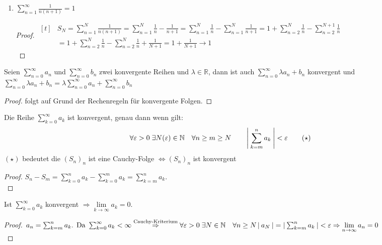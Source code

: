 \documentclass[a4paper,titlepage,oneside]{article}
\def\N{\ensuremath{\mathbb{N}} }
\def\R{\ensuremath{\mathbb{R}} }
\renewcommand{\epsilon}{\ensuremath{\varepsilon} }
\def\sp{\hspace{0,1cm}}
\newcommand{\suminf}[2][n]{\ensuremath{\sum_{#1= 0}^{\infty}{#2}}}
\newcommand{\Suminf}[2][n]{\ensuremath{\sum_{#1=1}^{\infty}{#2}}}
\renewcommand{\liminf}[2][n]{\ensuremath{\lim\limits_{#1 \rightarrow \infty}{#2}}}
\newcommand{\abs}[1]{\ensuremath{\left|\:#1\:\right|}}
\theoremstyle{thmstyle}
\begin{document}
\begin{subbsp}
\begin{enumerate}
\item $ \Suminf{\frac{1}{n(n+1)}}= 1 $
\begin{proof}
$\begin{aligned}[t]
&S_N = \sum_{n=1}^{N}{\frac{1}{n(n+1)}} = \sum_{n=1}^{N}{\frac{1}{n}} - \frac{1}{n+1} = \sum_{n=1}^{N}{\frac{1}{n}} - \sum_{n=1}^{N}{\frac{1}{n+1}}
= 1 + \sum_{n=2}^{N}{\frac{1}{n}} - \sum_{n=2}^{N+1}{\frac{1}{n}} \\
&= 1 + \sum_{n=2}^{N}{\frac{1}{n}} - \sum_{n=2}^{N}{\frac{1}{n}} + \frac{1}{N+1}
= 1 + \frac{1}{N+1} \longrightarrow 1
\end{aligned}$\\
\end{proof}
\end{enumerate}
\end{subbsp}

\begin{subsatz}
Seien \suminf{a_n} und \suminf{b_n} zwei konvergente Reihen und \(\lambda \in \R\),
dann ist auch \(\suminf{\lambda a_n + b_n}\) konvergent und \( \suminf{\lambda a_n + b_n} = \lambda \suminf{a_n} + \suminf{b_n}\)
\begin{proof}
folgt auf Grund der Rechenregeln für konvergente Folgen.
\end{proof}
\end{subsatz}

\begin{subsatz}
Die Reihe \(\suminf[k]{a_k}\) ist konvergent, genau dann wenn gilt:
\[\forall \epsilon > 0 \sp \exists N(\epsilon) \in \N \quad \forall n \ge m \ge N \qquad \abs{\sum_{k=m}^{n}{a_k}} < \epsilon \qquad (\star)\]
\((\star)\) bedeutet die \((S_n)_n\) ist eine Cauchy-Folge \(\Leftrightarrow (S_n)_n\) ist konvergent
\begin{proof}
\(S_n - S_m = \sum_{k=0}^{n}{a_k} - \sum_{k=0}^{m}{a_k} = \sum_{k=m}^{n}{a_k}\).\\
\end{proof}
\end{subsatz}

\begin{subkorr}
Ist \suminf[k]{a_k} konvergent \(\Rightarrow \liminf[k]{a_k} = 0\).
\begin{proof}
\(a_n = \sum_{k = m}^{n}{a_k} \text{. Da } \suminf[k]{a_k} < \infty \overset{\text{Cauchy-Kriterium}}{\Rightarrow} \forall \epsilon > 0 \sp \exists N \in \N \quad \forall n \ge N \abs{a_N} = \abs{ \sum_{k = m}^{n}{a_k}} < \epsilon  \Rightarrow \liminf{a_n} = 0\)\\
\end{proof}
\end{subkorr}
\end{document}
